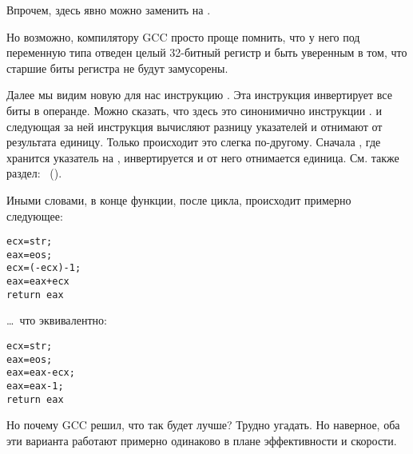 Впрочем, \MOVZX здесь явно можно заменить на .

Но возможно, компилятору GCC просто проще помнить, что у него под переменную типа \Tchar отведен целый 
32-битный регистр \EDX и быть уверенным в том, что старшие биты регистра не будут замусорены.

\label{strlen_NOT_ADD}
Далее мы видим новую для нас инструкцию \NOT. Эта инструкция инвертирует все биты в операнде. 
Можно сказать, что здесь это синонимично инструкции . 
\NOT и следующая за ней инструкция \ADD вычисляют разницу указателей и отнимают от результата единицу. 
Только происходит это слегка по-другому. Сначала \ECX, где хранится указатель на , 
инвертируется и от него отнимается единица.
См. также раздел: \q{\SignedNumbersSectionName}~().

Иными словами, в конце функции, после цикла, происходит примерно следующее: 

\begin{lstlisting}
ecx=str;
eax=eos;
ecx=(-ecx)-1; 
eax=eax+ecx
return eax
\end{lstlisting}

\dots~что эквивалентно:

\begin{lstlisting}
ecx=str;
eax=eos;
eax=eax-ecx;
eax=eax-1;
return eax
\end{lstlisting}

Но почему GCC решил, что так будет лучше? Трудно угадать.
Но наверное, оба эти варианта работают примерно одинаково в плане эффективности и скорости.
